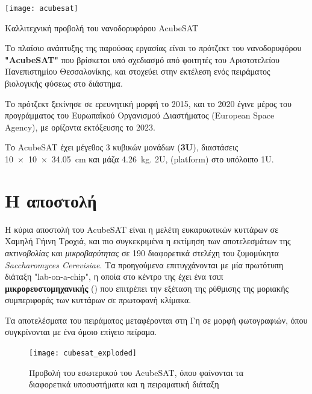 \documentclass[a4paper,nobib]{tufte-book}
\begin{document}
\begin{marginfigure}
	\centering
	\texttt{[image: acubesat]}
	\caption{Καλλιτεχνική προβολή του νανοδορυφόρου AcubeSAT}
\end{marginfigure}

Το πλαίσιο ανάπτυξης της παρούσας εργασίας είναι το πρότζεκτ του νανοδορυφόρου \textbf{"AcubeSAT"} που βρίσκεται υπό σχεδιασμό από φοιτητές του Αριστοτελείου Πανεπιστημίου Θεσσαλονίκης, και στοχεύει στην εκτέλεση ενός πειράματος βιολογικής φύσεως στο διάστημα.

Το πρότζεκτ ξεκίνησε σε ερευνητική μορφή το 2015, και το 2020 έγινε μέρος του προγράμματος  του Ευρωπαϊκού Οργανισμού Διαστήματος (European Space Agency), με ορίζοντα εκτόξευσης το 2023.

Το AcubeSAT έχει μέγεθος 3 κυβικών μονάδων (\textbf{3U}), διαστάσεις \SI[product-units = single]{10 x 10 x 34.05}{\centi\metre} και μάζα \SI{4.26}{\kilogram}.  2U,  (platform) στο υπόλοιπο 1U.

 

\section{Η αποστολή}


Η κύρια αποστολή του AcubeSAT είναι η μελέτη ευκαρυωτικών κυττάρων σε Χαμηλή Γήινη Τροχιά, και πιο συγκεκριμένα η εκτίμηση των αποτελεσμάτων της \emph{ακτινοβολίας} και \emph{μικροβαρύτητας} σε 190 διαφορετικά στελέχη του ζυμομύκητα \emph{Saccharomyces Cerevisiae}. Τα προηγούμενα επιτυγχάνονται με μία πρωτότυπη διάταξη "lab-on-a-chip", η οποία στο κέντρο της έχει ένα τσιπ \textbf{μικρορευστομηχανικής} () \autocite{volpetti_microfluidic_biodisplay_2017} που επιτρέπει την εξέταση της ρύθμισης της μοριακής συμπεριφοράς των κυττάρων σε πρωτοφανή κλίμακα.

Τα αποτελέσματα του πειράματος μεταφέρονται στη Γη σε μορφή φωτογραφιών, όπου συγκρίνονται με ένα όμοιο επίγειο πείραμα.



\begin{figure}[th]
	\centering
	\texttt{[image: cubesat\_exploded]}
	\caption{Προβολή του εσωτερικού του AcubeSAT, όπου φαίνονται τα διαφορετικά υποσυστήματα και η πειραματική διάταξη}
\end{figure}
\end{document}
